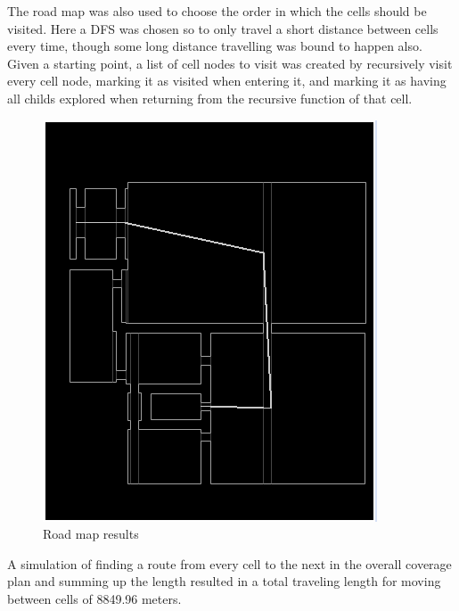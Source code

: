 The road map was also used to choose the order in which the cells should be
visited. Here a DFS was chosen so to only travel a short distance between cells
every time, though some long distance travelling was bound to happen also. Given
a starting point, a list of cell nodes to visit was created by recursively visit
every cell node, marking it as visited when entering it, and marking it as
having all childs explored when returning from the recursive function of that
cell.

\begin{figure}[htb] \centering \includegraphics[width=\textwidth,trim=0 0 0
0]{graphics/pic2.png}
	\caption{Road map results}
	\label{fig:Roadmapresults}			
\end{figure}


A simulation of finding a route from every cell to the next in the overall
coverage plan and summing up the length resulted in a total traveling length for
moving between cells of 8849.96 meters.



